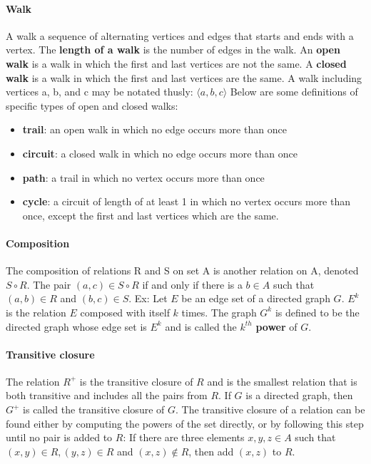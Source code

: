 \documentclass[a4paper]{article}
\begin{document}
\paragraph{Walk} A walk a sequence of alternating vertices and edges that starts and ends with a vertex. The \textbf{length of a walk} is the number of edges in the walk. An \textbf{open walk} is a walk in which the first and last vertices are not the same. A \textbf{closed walk} is a walk in which the first and last vertices are the same. A walk including vertices a, b, and c may be notated thusly: $\langle a, b, c \rangle$ Below are some definitions of specific types of open and closed walks:
\begin{itemize}
  \item \textbf{trail}: an open walk in which no edge occurs more than once
  \item \textbf{circuit}: a closed walk in which no edge occurs more than once
  \item \textbf{path}: a trail in which no vertex occurs more than once
  \item \textbf{cycle}: a circuit of length of at least 1 in which no vertex occurs more than once, except the first and last vertices which are the same.
\end{itemize}

\paragraph{Composition} The composition of relations R and S on set A is another relation on A, denoted $S \circ R$. The pair $(a, c) \in S \circ R$ if and only if there is a $b \in A$ such that $(a, b) \in R$ and $(b, c) \in S$. Ex: Let $E$ be an edge set of a directed graph $G$. $E^k$ is the relation $E$ composed with itself $k$ times. The graph $G^k$ is defined to be the directed graph whose edge set is $E^k$ and is called the $k^{th}$ \textbf{power} of $G$. 
\paragraph{Transitive closure} The relation $R^+$ is the transitive closure of $R$ and is the smallest relation that is both transitive and includes all the pairs from $R$. If $G$ is a directed graph, then $G^+$ is called the transitive closure of $G$. The transitive closure of a relation can be found either by computing the powers of the set directly, or by following this step until no pair is added to $R$: If there are three elements $x, y, z \in A$ such that $(x, y) \in R, (y, z) \in R$ and $(x, z) \notin R$, then add $(x, z)$ to $R$.
\end{document}
